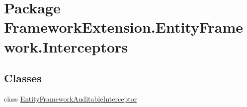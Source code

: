 \hypertarget{namespace_framework_extension_1_1_entity_framework_1_1_interceptors}{\section{Package Framework\-Extension.\-Entity\-Framework.\-Interceptors}
\label{namespace_framework_extension_1_1_entity_framework_1_1_interceptors}
}
\subsection*{Classes}
\begin{DoxyCompactItemize}
\item 
class \hyperlink{class_framework_extension_1_1_entity_framework_1_1_interceptors_1_1_entity_framework_auditable_interceptor}{Entity\-Framework\-Auditable\-Interceptor}
\end{DoxyCompactItemize}
